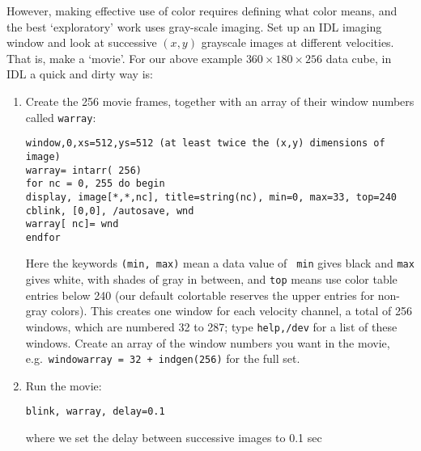 \documentclass[psfig,preprint]{aastex}
\begin{document}
However, making effective use of color requires defining what color
means, and the best `exploratory' work uses gray-scale imaging.  Set up
an IDL imaging window and look at successive $(x,y)$ grayscale images at
different velocities. That is, make a `movie'. For our above example
$360 \times 180 \times 256$ data cube, in IDL a quick and dirty way
is: \begin{enumerate}

\item Create the 256 movie frames, together with an array of their
  window numbers called {\tt warray}:

\begin{verbatim}
window,0,xs=512,ys=512 (at least twice the (x,y) dimensions of image)
warray= intarr( 256)
for nc = 0, 255 do begin
display, image[*,*,nc], title=string(nc), min=0, max=33, top=240
cblink, [0,0], /autosave, wnd
warray[ nc]= wnd
endfor
\end{verbatim}

\noindent Here the keywords {\tt (min, max)} mean a data value of {\tt
  min} gives black and {\tt max} gives white, with shades of gray in
between, and {\tt top} means use color table entries below 240 (our
default colortable reserves the upper entries for non-gray colors).
This creates one window for each velocity channel, a total of 256
windows, which are numbered 32 to 287; type {\tt help,/dev} for a list of
these windows. Create an array of the window numbers you want in the
movie, e.g.\ {\tt windowarray = 32 + indgen(256)} for the full set. 

\item Run the movie:

{\tt blink, warray, delay=0.1}

\noindent where we set the delay between successive images to 0.1 sec
\end{enumerate}
\end{document}
